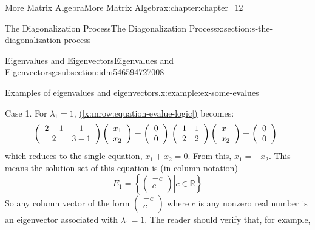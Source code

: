 \documentclass[oneside,10pt,]{book}
\newcommand{\xreffont}{\relax}
\numberwithin{equation}{section}
\begin{document}
\begin{chapterptx}{More Matrix Algebra}{}{More Matrix Algebra}{}{}{x:chapter:chapter_12}
\begin{sectionptx}{The Diagonalization Process}{}{The Diagonalization Process}{}{}{x:section:s-the-diagonalization-process}
\begin{subsectionptx}{Eigenvalues and Eigenvectors}{}{Eigenvalues and Eigenvectors}{}{}{g:subsection:idm546594727008}
\begin{example}{Examples of eigenvalues and eigenvectors.}{x:example:ex-some-evalues}
\par
Case 1. For \(\lambda_1= 1\),  \hyperref[x:mrow:equation-evalue-logic]{({\xreffont\ref{x:mrow:equation-evalue-logic}})}  becomes:%
\begin{equation*}
\left(
\begin{array}{cc}
2-1 & 1 \\
2 & 3-1 \\
\end{array}
\right) \left(
\begin{array}{c}
x_1 \\
x_2 \\
\end{array}
\right)=\left(
\begin{array}{c}
0 \\
0 \\
\end{array}
\right) \\
\\
\left(
\begin{array}{cc}
1 & 1 \\
2 & 2 \\
\end{array}
\right) \left(
\begin{array}{c}
x_1 \\
x_2 \\
\end{array}
\right)=\left(
\begin{array}{c}
0 \\
0 \\
\end{array}
\right)\textrm{    } 
\end{equation*}
which reduces to the single equation, \(x_1+ x_2= 0\).  From this, \(x_1= -x_2\). This means the solution set of this equation is (in column notation)%
\begin{equation*}
E_1 = \left\{ \left.\left(
\begin{array}{c}
-c \\
c \\
\end{array}
\right) \right| c\in  \mathbb{R}\right\}
\end{equation*}
So any column vector of the form \(\left(
\begin{array}{c}
-c \\
c \\
\end{array}
\right)\) where \(c\) is any nonzero real number is an eigenvector associated with  \(\lambda_1=1\).   The reader should verify that, for example,%

\end{example}
\end{subsectionptx}
\end{sectionptx}
\end{chapterptx}
\end{document}
